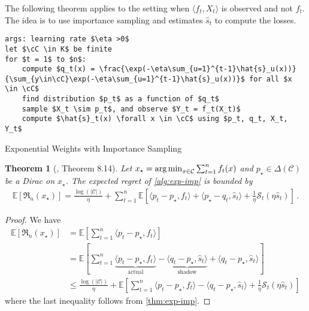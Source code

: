 \documentclass{article}
\theoremstyle{plain}
\newtheorem{theorem}{Theorem}
\theoremstyle{definition}
\theoremstyle{remark}
\newcommand{\argmin}{\operatornamewithlimits{arg\,min}}
\newcommand{\Reg}{\mathfrak{R}}
\newcommand{\E}{\mathbb E}
\newcommand{\cS}{\mathcal S}
\newcommand{\cC}{\mathcal C}
\theoremstyle{definition}
\begin{document}
The following theorem applies to the setting when $\langle f_t, X_t \rangle$ is observed and not $f_t$.
The idea is to use importance sampling and estimates $\hat{s}_t$ to compute the losses.
\begin{algorithm}[h!]
    \begin{minipage}{12cm}
        \begin{mdframed}
            \begin{lstlisting}
args: learning rate $\eta >0$
let $\cC \in K$ be finite
for $t = 1$ to $n$:
    compute $q_t(x) = \frac{\exp(-\eta\sum_{u=1}^{t-1}\hat{s}_u(x))}{\sum_{y\in\cC}\exp(-\eta\sum_{u=1}^{t-1}\hat{s}_u(x))}$ for all $x \in \cC$
    find distribution $p_t$ as a function of $q_t$
    sample $X_t \sim p_t$, and observe $Y_t = f_t(X_t)$
    compute $\hat{s}_t(x) \forall x \in \cC$ using $p_t, q_t, X_t, Y_t$
\end{lstlisting}
            \caption{Exponential Weights with Importance Sampling}\label{alg:exp-imp}
        \end{mdframed}
    \end{minipage}
\end{algorithm}

\begin{theorem}[\cite{lattimore2024bandit}, Theorem 8.14]
    \label{thm:exp-imp-regret}
    Let $x_\star = \argmin_{x \in \cC} \sum_{t=1}^{n} f_t(x)$ and
    $p_\star \in \Delta(\cC)$ be a Dirac on $x_\star$.
    The expected regret of \cref{alg:exp-imp} is bounded by
    \begin{align*}
        \E\left[\Reg_n(x_\star)\right]
        = \frac{\log(|\cC|)}{\eta} +
        \sum_{t=1}^{n} \E\left[
            \langle p_t - p_\star, f_t \rangle
            + \langle p_\star - q_t, \hat{s}_t \rangle
            + \frac{1}{\eta} \cS_t(\eta \hat{s}_t)
            \right]\,.
    \end{align*}
\end{theorem}
\begin{proof}
    We have
    \begin{align*}
        \E\left[\Reg_n(x_\star)\right]
         & =
        \E\left[
            \sum_{t=1}^{n} \langle p_t - p_\star, f_t \rangle
        \right] \\
         & =
        \E\left[
        \sum_{t=1}^{n}
        \underbrace{\langle p_t - p_\star, f_t \rangle}_{\text{actual}}
        - \underbrace{\langle q_t - p_\star, \hat{s}_t \rangle}_{\text{shadow}}
        + \langle q_t - p_\star, \hat{s}_t \rangle
        \right] \\
         & \leq
        \frac{\log(|\cC|)}{\eta}+
        \E\left[
            \sum_{t=1}^{n}
            \langle p_t - p_\star, f_t \rangle
            - \langle q_t - p_\star, \hat{s}_t \rangle
            + \frac{1}{\eta} \cS_t(\eta \hat{s}_t)
            \right]
    \end{align*}
    where the last inequality follows from \cref{thm:exp-imp}.
\end{proof}
\end{document}
